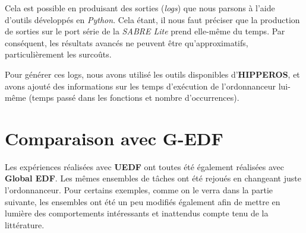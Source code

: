 	Cela est possible en produisant des sorties (\textit{logs}) que nous parsons à l'aide d'outils 
	développés en \textit{Python}. Cela étant, il nous faut préciser que la production de sorties sur le 
	port série de la \textit{SABRE Lite} prend elle-même du temps. Par conséquent, 
	les résultats avancés ne peuvent être qu'approximatifs, particulièrement les surcoûts.\newline
	
	Pour générer ces logs, nous avons utilisé les outils disponibles d'\textbf{HIPPEROS}, et avons ajouté des informations 
	sur les temps d'exécution de l'ordonnanceur lui-même (temps passé dans les fonctions et nombre d'occurrences).
	

\section{Comparaison avec G-EDF}

	Les expériences réalisées avec \textbf{UEDF }ont toutes été également réalisées avec \textbf{Global EDF}.
	Les mêmes ensembles de tâches ont été rejoués en changeant juste l'ordonnanceur. Pour certains exemples, comme
	on le verra dans la partie suivante, les ensembles ont été un peu modifiés également afin de 
	mettre en lumière des comportements intéressants et inattendus compte tenu de la littérature.